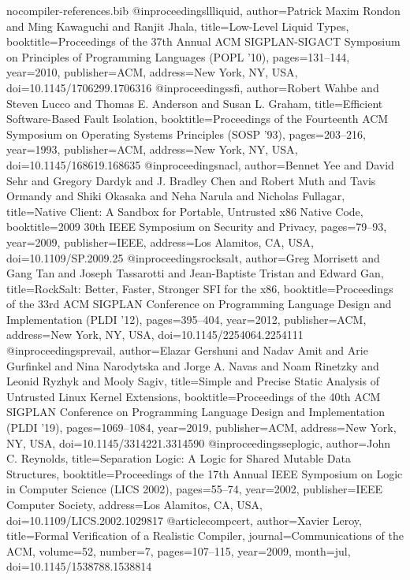 \begin{filecontents*}[overwrite]{nocompiler-references.bib}
@inproceedings{llliquid, author={Patrick Maxim Rondon and Ming Kawaguchi and Ranjit Jhala}, title={Low-Level Liquid Types}, booktitle={Proceedings of the 37th Annual ACM SIGPLAN-SIGACT Symposium on Principles of Programming Languages (POPL '10)}, pages={131--144}, year={2010}, publisher={ACM}, address={New York, NY, USA}, doi={10.1145/1706299.1706316}}
@inproceedings{sfi, author={Robert Wahbe and Steven Lucco and Thomas E. Anderson and Susan L. Graham}, title={Efficient Software-Based Fault Isolation}, booktitle={Proceedings of the Fourteenth ACM Symposium on Operating Systems Principles (SOSP '93)}, pages={203--216}, year={1993}, publisher={ACM}, address={New York, NY, USA}, doi={10.1145/168619.168635}}
@inproceedings{nacl, author={Bennet Yee and David Sehr and Gregory Dardyk and J. Bradley Chen and Robert Muth and Tavis Ormandy and Shiki Okasaka and Neha Narula and Nicholas Fullagar}, title={Native Client: A Sandbox for Portable, Untrusted x86 Native Code}, booktitle={2009 30th IEEE Symposium on Security and Privacy}, pages={79--93}, year={2009}, publisher={IEEE}, address={Los Alamitos, CA, USA}, doi={10.1109/SP.2009.25}}
@inproceedings{rocksalt, author={Greg Morrisett and Gang Tan and Joseph Tassarotti and Jean-Baptiste Tristan and Edward Gan}, title={RockSalt: Better, Faster, Stronger SFI for the x86}, booktitle={Proceedings of the 33rd ACM SIGPLAN Conference on Programming Language Design and Implementation (PLDI '12)}, pages={395--404}, year={2012}, publisher={ACM}, address={New York, NY, USA}, doi={10.1145/2254064.2254111}}
@inproceedings{prevail, author={Elazar Gershuni and Nadav Amit and Arie Gurfinkel and Nina Narodytska and Jorge A. Navas and Noam Rinetzky and Leonid Ryzhyk and Mooly Sagiv}, title={Simple and Precise Static Analysis of Untrusted Linux Kernel Extensions}, booktitle={Proceedings of the 40th ACM SIGPLAN Conference on Programming Language Design and Implementation (PLDI '19)}, pages={1069--1084}, year={2019}, publisher={ACM}, address={New York, NY, USA}, doi={10.1145/3314221.3314590}}
@inproceedings{seplogic, author={John C. Reynolds}, title={Separation Logic: A Logic for Shared Mutable Data Structures}, booktitle={Proceedings of the 17th Annual IEEE Symposium on Logic in Computer Science (LICS 2002)}, pages={55--74}, year={2002}, publisher={IEEE Computer Society}, address={Los Alamitos, CA, USA}, doi={10.1109/LICS.2002.1029817}}
@article{compcert, author={Xavier Leroy}, title={Formal Verification of a Realistic Compiler}, journal={Communications of the ACM}, volume={52}, number={7}, pages={107--115}, year={2009}, month=jul, doi={10.1145/1538788.1538814}}

\end{filecontents*}
